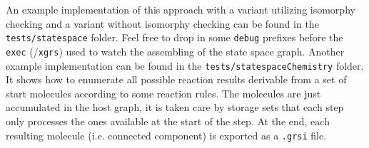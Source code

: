 An example implementation of this approach with a variant utilizing isomorphy checking and a variant without isomorphy checking can be found in the \texttt{tests/statespace} folder.
Feel free to drop in some \texttt{debug} prefixes before the \texttt{exec} (/\texttt{xgrs}) used to watch the assembling of the state space graph.
Another example implementation can be found in the \texttt{tests/statespaceChemistry} folder.
It shows how to enumerate all possible reaction results derivable from a set of start molecules according to some reaction rules.
The molecules are just accumulated in the host graph, it is taken care by storage sets that each step only processes the ones available at the start of the step.
At the end, each resulting molecule (i.e. connected component) is exported as a \texttt{.grsi} file.

